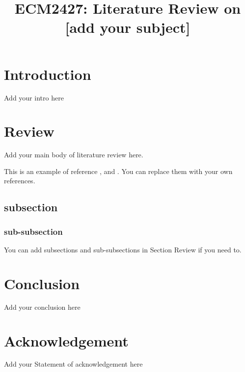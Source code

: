 \documentclass[conference]{IEEEtran}  %
\begin{document}
\title{ECM2427: Literature Review on [add your subject]}


\author{ %
}

\maketitle  %


\section{Introduction} %

Add your intro here

\section{Review} %

Add your main body of literature review here.

This is an example of reference \cite{bengio2021machine}, and \cite{smith2009foundations,zhou2021machine}. You can replace them with your own references.

\subsection{subsection}
\subsubsection{sub-subsection}

You can add subsections and sub-subsections in Section Review if you need to.

\section{Conclusion} %
Add your conclusion here

\section*{Acknowledgement} 
Add your Statement of acknowledgement here


\end{document}
